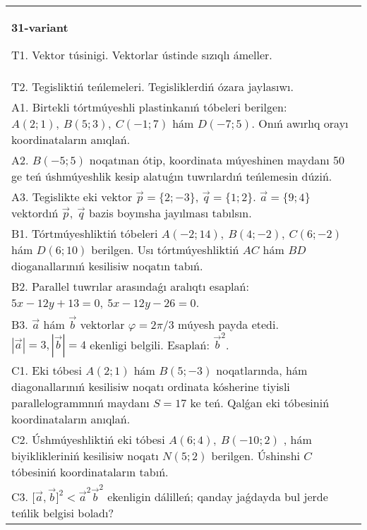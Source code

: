 \documentclass{article}
\begin{document}
\begin{tabular}{m{17cm}}
\textbf{31-variant}
\newline

T1. 
Vektor túsinigi. Vektorlar ústinde sızıqlı ámeller.
 \\
T2. 
Tegisliktiń teńlemeleri. Tegisliklerdiń ózara jaylasıwı.
 \\
A1. 
Birtekli tórtmúyeshli plastinkanıń tóbeleri berilgen:
$A(2;1), \ B(5;3), \ C(-1;7)$ hám $D(-7;5)$. Onıń awırlıq orayı
koordinataların anıqlań.
 \\
A2. 
$B(-5;5)$ noqatınan ótip, koordinata múyeshinen
maydanı 50 ge teń úshmúyeshlik kesip alatuǵın tuwrılardıń teńlemesin
dúziń.
 \\
A3. 
Tegislikte eki vektor
$\overrightarrow{p} = \{ 2; - 3\}$, $\overrightarrow{q} = \{ 1;2\}$.
$\overrightarrow{a} = \{9;4\}$ vektordıń
$\overrightarrow{p},\ \overrightarrow{q}$ bazis boyınsha jayılması tabılsın.
 \\
B1. 
Tórtmúyeshliktiń tóbeleri
\(A(-2;14),\ B(4;-2),\ C(6;-2)\) hám \(D(6;10)\) berilgen. Usı
tórtmúyeshliktiń $AC$ hám $BD$ dioganallarınıń kesilisiw
noqatın tabıń.
 \\
B2. 
Parallel tuwrılar arasındaǵı aralıqtı esaplań: $5x-12y+13=0,\ 5x-12y-26=0$.
 \\
B3. 
$\vec{a}$ hám $\vec{b}$ vektorlar $\varphi = 2\pi/3$ múyesh payda etedi. $|\vec{a}| = 3,|\vec{b}| = 4$ ekenligi belgili. Esaplań: 
${\vec{b}}^{2}$.
 \\
C1. 
Eki tóbesi \(A(2;1)\) hám \(B(5; - 3)\) noqatlarında, hám
diagonallarınıń kesilisiw noqatı ordinata kósherine tiyisli
parallelogrammnıń maydanı \(S = 17\) ke teń. Qalǵan eki tóbesiniń
koordinataların anıqlań. \\
C2. 
Úshmúyeshliktiń eki tóbesi \(A(6;4),\ B( - 10;2)\) , hám
biyiklikleriniń kesilisiw noqatı \(N(5;2)\) berilgen. Úshinshi $C$
tóbesiniń koordinataların tabıń.
 \\
C3. 
\(\lbrack\vec{a},\vec{b}\rbrack^{2} <  {\vec{a}}^{2}{\vec{b}}^{2}\) ekenligin dálilleń; qanday jaǵdayda bul jerde teńlik belgisi boladı?
 \\

\end{tabular}
\vspace{1cm}
\end{document}
